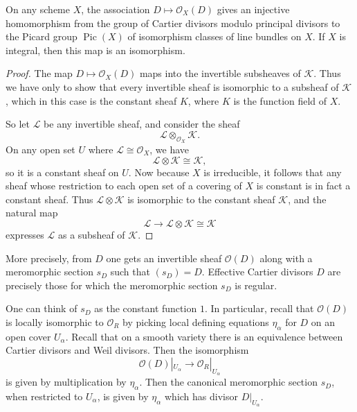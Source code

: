 \documentclass[12pt]{article}
\begin{document}
\begin{proposition} On any scheme $X$, the association $D \mapsto \mathcal O_X(D)$ gives an injective homomorphism from the group of Cartier divisors modulo principal divisors to the Picard group $\operatorname{Pic}(X)$ of isomorphism classes of line bundles on $X$. If $X$ is integral, then this map is an isomorphism.
\end{proposition}

\begin{proof}
    The map $D \mapsto \mathcal O_X(D)$ maps into the invertible subsheaves of $\mathcal{K}$. Thus we have only to show that every invertible sheaf is isomorphic to a subsheaf of \(\mathcal{K}\), which in this case is the constant sheaf \(K\), where \(K\) is the function field of \(X\).

    So let \(\mathcal{L}\) be any invertible sheaf, and consider the sheaf
    \[
        \mathcal{L} \otimes_{\mathcal{O}_X} \mathcal{K}.
    \]
    On any open set \(U\) where \(\mathcal{L} \cong \mathcal{O}_X\), we have
    \[
        \mathcal{L} \otimes \mathcal{K} \cong \mathcal{K},
    \]
    so it is a constant sheaf on \(U\). Now because \(X\) is irreducible, it follows that any sheaf whose restriction to each open set of a covering of \(X\) is constant is in fact a constant sheaf. Thus
    $\mathcal{L} \otimes \mathcal{K}$
    is isomorphic to the constant sheaf \(\mathcal{K}\), and the natural map
    \[
        \mathcal{L} \to \mathcal{L} \otimes \mathcal{K} \cong \mathcal{K}
    \]
    expresses \(\mathcal{L}\) as a subsheaf of \(\mathcal{K}\).
\end{proof}
More precisely, from \(D\) one gets an invertible sheaf \(\mathcal O(D)\) along with a meromorphic section \(s_D\) such that \((s_D)=D\). Effective Cartier divisors $D$ are precisely those for which the meromorphic section \(s_D\) is regular.

One can think of \(s_D\) as the constant function \(1\). In particular, recall that \(\mathcal O(D)\) is locally isomorphic to \(\mathcal O_R\) by picking local defining equations \(\eta_\alpha\) for \(D\) on an open cover \(U_\alpha\). Recall that on a smooth variety there is an equivalence between Cartier divisors and Weil divisors. Then the isomorphism
\[
    \mathcal O(D)|_{U_\alpha} \to \mathcal O_R|_{U_\alpha}
\]
is given by multiplication by \(\eta_\alpha\). Then the canonical meromorphic section \(s_D\), when restricted to \(U_\alpha\), is given by \(\eta_\alpha\) which has divisor \(D|_{U_\alpha}\).
\end{document}
